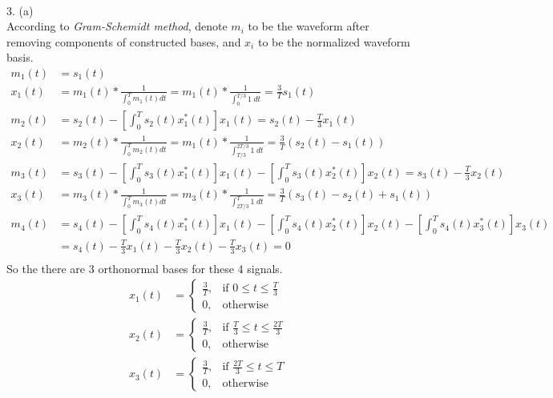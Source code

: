 \documentclass [12pt] {article}
\begin{document}
\begin{spacing}{1.5}
~\\
3. (a)\\
According to \emph{Gram-Schemidt method}, denote $m_{i}$ to be the waveform after removing components of constructed bases, and $x_{i}$ to be the normalized waveform basis. 
\begin{align*}
m_1(t) &= s_1(t)\\
x_1(t) &= m_1(t) * \frac{1}{\int_0^T m_1(t)dt} =  m_1(t) * \frac{1}{\int_0^{T/3} 1 \;dt} = \frac{3}{T} s_1(t)\\ 
m_2(t) &= s_2(t)-[\int_0^T s_2(t)x_{1}^{*}(t)]x_1(t) = s_2(t) - \frac{T}{3} x_1(t)\\
x_2(t) &= m_2(t) * \frac{1}{\int_0^T m_2(t)dt} =  m_1(t) * \frac{1}{\int_{T/3}^{2T/3} 1 \;dt} = \frac{3}{T}( s_2(t) - s_1(t))\\ 
m_3(t) &= s_3(t)-[\int_0^T s_3(t)x_{1}^{*}(t)]x_1(t)-[\int_0^T s_3(t)x_{2}^{*}(t)]x_2(t) = s_3(t) - \frac{T}{3} x_2(t)\\
x_3(t) &= m_3(t) * \frac{1}{\int_0^T m_3(t)dt} =  m_3(t) * \frac{1}{\int_{2T/3}^{T} 1 \;dt} = \frac{3}{T}( s_3(t) - s_2(t) + s_1(t))\\ 
m_4(t) &= s_4(t)-[\int_0^T s_4(t)x_{1}^{*}(t)]x_1(t)-[\int_0^T s_4(t)x_{2}^{*}(t)]x_2(t) -[\int_0^T s_4(t)x_{3}^{*}(t)]x_3(t)\\
&= s_4(t) - \frac{T}{3} x_1(t) - \frac{T}{3} x_2(t) - \frac{T}{3} x_3(t) = 0\\
\end{align*}
So the there are 3 orthonormal bases for these 4 signals.\\
\begin{align*}
x_1(t) &= 
\begin{cases}
    \frac{3}{T}, & \text{if } 0\leq t \leq \frac{T}{3}\\
    0,              & \text{otherwise}
\end{cases}\\
x_2(t) &= 
\begin{cases}
    \frac{3}{T}, & \text{if } \frac{T}{3}\leq t \leq \frac{2T}{3}\\
    0,              & \text{otherwise}
\end{cases}\\
x_3(t) &= 
\begin{cases}
    \frac{3}{T}, & \text{if } \frac{2T}{3}\leq t \leq T\\
    0,              & \text{otherwise}
\end{cases}
\end{align*}
~\\

\end{spacing}
\end{document}
